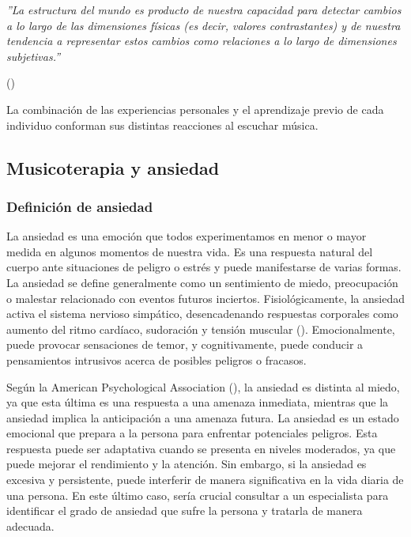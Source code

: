 \begin{itemize}
	\begin{adjustwidth}{100pt}{0pt}
		\textit{''La estructura del mundo es producto de nuestra capacidad para detectar cambios a lo largo de las dimensiones físicas (es decir, valores contrastantes) y de nuestra tendencia a representar estos cambios como relaciones a lo largo de dimensiones subjetivas.''}
		\begin{flushright}
			\vspace{-10px}
			(\cite{JONES:1976})
		\end{flushright}
	\end{adjustwidth}
\end{itemize}

La combinación de las experiencias personales y el aprendizaje previo de cada individuo conforman sus distintas reacciones al escuchar música.

\subsection{Musicoterapia y ansiedad}

\subsubsection{Definición de ansiedad}

La ansiedad es una emoción que todos experimentamos en menor o mayor medida en algunos momentos de nuestra vida. Es una respuesta natural del cuerpo ante situaciones de peligro o estrés y puede manifestarse de varias formas. La ansiedad se define generalmente como un sentimiento de miedo, preocupación o malestar relacionado con eventos futuros inciertos. Fisiológicamente, la ansiedad activa el sistema nervioso simpático, desencadenando respuestas corporales como aumento del ritmo cardíaco, sudoración y tensión muscular (\cite{APA:2013}). Emocionalmente, puede provocar sensaciones de temor, y cognitivamente, puede conducir a pensamientos intrusivos acerca de posibles peligros o fracasos.

Según la American Psychological Association (\citeyear{APA:2020}), la ansiedad es distinta al miedo, ya que esta última es una respuesta a una amenaza inmediata, mientras que la ansiedad implica la anticipación a una amenaza futura. La ansiedad es un estado emocional que prepara a la persona para enfrentar potenciales peligros. Esta respuesta puede ser adaptativa cuando se presenta en niveles moderados, ya que puede mejorar el rendimiento y la atención. Sin embargo, si la ansiedad es excesiva y persistente, puede interferir de manera significativa en la vida diaria de una persona. En este último caso, sería crucial consultar a un especialista para identificar el grado de ansiedad que sufre la persona y tratarla de manera adecuada.

